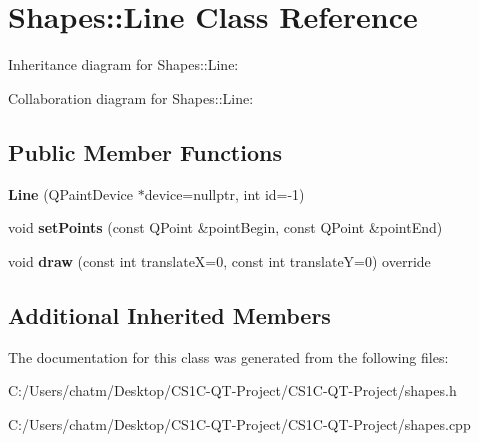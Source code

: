\hypertarget{class_shapes_1_1_line}{}\section{Shapes\+::Line Class Reference}
\label{class_shapes_1_1_line}


Inheritance diagram for Shapes\+::Line\+:


Collaboration diagram for Shapes\+::Line\+:
\subsection*{Public Member Functions}
\begin{DoxyCompactItemize}
\item 
\mbox{\label{class_shapes_1_1_line_a6d7b2b01a72da942ba413357434893ec}} 
{\bfseries Line} (Q\+Paint\+Device $\ast$device=nullptr, int id=-\/1)
\item 
\mbox{\label{class_shapes_1_1_line_aa83985e1ac2e38a2c651163a5bcb0d87}} 
void {\bfseries set\+Points} (const Q\+Point \&point\+Begin, const Q\+Point \&point\+End)
\item 
\mbox{\label{class_shapes_1_1_line_a993d03f760a307147acd2002bfc26b0b}} 
void {\bfseries draw} (const int translateX=0, const int translateY=0) override
\end{DoxyCompactItemize}
\subsection*{Additional Inherited Members}


The documentation for this class was generated from the following files\+:\begin{DoxyCompactItemize}
\item 
C\+:/\+Users/chatm/\+Desktop/\+C\+S1\+C-\/\+Q\+T-\/\+Project/\+C\+S1\+C-\/\+Q\+T-\/\+Project/shapes.\+h\item 
C\+:/\+Users/chatm/\+Desktop/\+C\+S1\+C-\/\+Q\+T-\/\+Project/\+C\+S1\+C-\/\+Q\+T-\/\+Project/shapes.\+cpp\end{DoxyCompactItemize}
